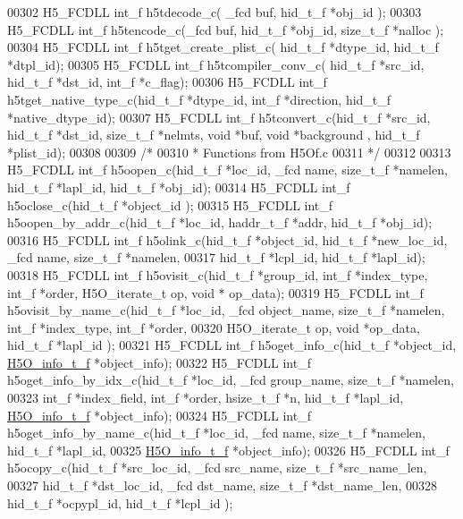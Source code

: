 \begin{DoxyCode}
00302 H5\_FCDLL int\_f h5tdecode\_c( \_fcd buf, hid\_t\_f *obj\_id );
00303 H5\_FCDLL int\_f h5tencode\_c(\_fcd buf, hid\_t\_f *obj\_id, size\_t\_f *nalloc );
00304 H5\_FCDLL int\_f h5tget\_create\_plist\_c( hid\_t\_f *dtype\_id,  hid\_t\_f *dtpl\_id);
00305 H5\_FCDLL int\_f h5tcompiler\_conv\_c( hid\_t\_f *src\_id, hid\_t\_f *dst\_id, int\_f *c\_flag);
00306 H5\_FCDLL int\_f h5tget\_native\_type\_c(hid\_t\_f *dtype\_id, int\_f *direction, hid\_t\_f *native\_dtype\_id);
00307 H5\_FCDLL int\_f h5tconvert\_c(hid\_t\_f *src\_id, hid\_t\_f *dst\_id, size\_t\_f *nelmts, \textcolor{keywordtype}{void} *buf, \textcolor{keywordtype}{void} *background
      , hid\_t\_f *plist\_id);
00308 
00309 \textcolor{comment}{/*}
00310 \textcolor{comment}{ * Functions from H5Of.c}
00311 \textcolor{comment}{ */}
00312 
00313 H5\_FCDLL int\_f h5oopen\_c(hid\_t\_f *loc\_id, \_fcd name, size\_t\_f *namelen, hid\_t\_f *lapl\_id, hid\_t\_f *obj\_id);
00314 H5\_FCDLL int\_f h5oclose\_c(hid\_t\_f *object\_id );
00315 H5\_FCDLL int\_f h5oopen\_by\_addr\_c(hid\_t\_f *loc\_id, haddr\_t\_f *addr, hid\_t\_f *obj\_id);
00316 H5\_FCDLL int\_f h5olink\_c(hid\_t\_f *object\_id, hid\_t\_f *new\_loc\_id, \_fcd name, size\_t\_f *namelen,
00317                hid\_t\_f *lcpl\_id, hid\_t\_f *lapl\_id);
00318 H5\_FCDLL int\_f h5ovisit\_c(hid\_t\_f *group\_id, int\_f *index\_type, int\_f *order, H5O\_iterate\_t op, \textcolor{keywordtype}{void} *
      op\_data);
00319 H5\_FCDLL int\_f h5ovisit\_by\_name\_c(hid\_t\_f *loc\_id,  \_fcd object\_name, size\_t\_f *namelen, int\_f *index\_type,
       int\_f *order,
00320                    H5O\_iterate\_t op, \textcolor{keywordtype}{void} *op\_data, hid\_t\_f *lapl\_id );
00321 H5\_FCDLL int\_f h5oget\_info\_c(hid\_t\_f *object\_id, \hyperlink{struct_h5_o__info__t__f}{H5O\_info\_t\_f} *object\_info);
00322 H5\_FCDLL int\_f h5oget\_info\_by\_idx\_c(hid\_t\_f *loc\_id, \_fcd  group\_name, size\_t\_f *namelen, 
00323                       int\_f *index\_field, int\_f *order, hsize\_t\_f *n, hid\_t\_f *lapl\_id, 
      \hyperlink{struct_h5_o__info__t__f}{H5O\_info\_t\_f} *object\_info);
00324 H5\_FCDLL int\_f h5oget\_info\_by\_name\_c(hid\_t\_f *loc\_id, \_fcd name, size\_t\_f *namelen, hid\_t\_f *lapl\_id,
00325                        \hyperlink{struct_h5_o__info__t__f}{H5O\_info\_t\_f} *object\_info);
00326 H5\_FCDLL int\_f h5ocopy\_c(hid\_t\_f *src\_loc\_id, \_fcd src\_name, size\_t\_f *src\_name\_len,
00327                hid\_t\_f *dst\_loc\_id, \_fcd dst\_name, size\_t\_f *dst\_name\_len, 
00328                hid\_t\_f *ocpypl\_id, hid\_t\_f *lcpl\_id );

\end{DoxyCode}
